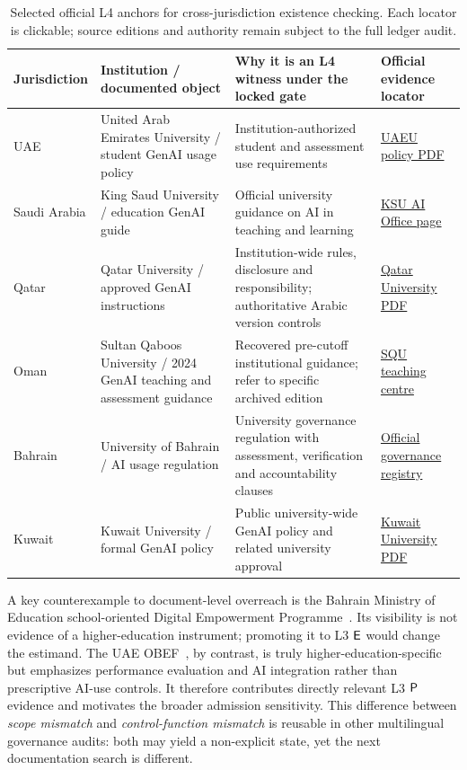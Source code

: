 \begin{table}[t]
\centering\caption{Selected official L4 anchors for cross-jurisdiction existence checking. Each locator is clickable; source editions and authority remain subject to the full ledger audit.}\label{tab:anchors}\footnotesize
\begin{tabularx}{\textwidth}{@{}p{}p{}p{}X@{}}
\toprule
Jurisdiction & Institution / documented object & Why it is an L4 witness under the locked gate & Official evidence locator\tabularnewline\midrule
UAE & United Arab Emirates University / student GenAI usage policy & Institution-authorized student and assessment use requirements & \href{https://www.uaeu.ac.ae/en/about/pdfs/policies-2025/generative-ai-policy.pdf}{UAEU policy PDF}\tabularnewline
Saudi Arabia & King Saud University / education GenAI guide & Official university guidance on AI in teaching and learning & \href{https://aio.ksu.edu.sa/ar/node/2976}{KSU AI Office page}\tabularnewline
Qatar & Qatar University / approved GenAI instructions & Institution-wide rules, disclosure and responsibility; authoritative Arabic version controls & \href{https://www.qu.edu.qa/en-us/about/policy/Documents/Instructions\%20onThe\%20Use\%20of\%20Generative\%20Artificial\%20Intelligence\%20Tools\%20at\%20Qatar\%20University-Approved.pdf}{Qatar University PDF}\tabularnewline
Oman & Sultan Qaboos University / 2024 GenAI teaching and assessment guidance & Recovered pre-cutoff institutional guidance; refer to specific archived edition & \href{https://www.squ.edu.om/About/Support-Centers-/Centre-For-Excellence-In-Teaching-and-Learning}{SQU teaching centre}\tabularnewline
Bahrain & University of Bahrain / AI usage regulation & University governance regulation with assessment, verification and accountability clauses & \href{https://governance.uob.edu.bh/view/297/entry/156/?pagenum=3}{Official governance registry}\tabularnewline
Kuwait & Kuwait University / formal GenAI policy & Public university-wide GenAI policy and related university approval & \href{https://www.ku.edu.kw/sites/default/files/2024-12/AI\%20Policy\%202024\%20November\%20-\%20English.pdf}{Kuwait University PDF}\tabularnewline
\bottomrule
\end{tabularx}
\end{table}

A key counterexample to document-level overreach is the Bahrain Ministry of Education school-oriented Digital Empowerment Programme~\cite{bahrain}. Its visibility is not evidence of a higher-education instrument; promoting it to L3 $\textsf{E}$ would change the estimand. The UAE OBEF~\cite{obef}, by contrast, is truly higher-education-specific but emphasizes performance evaluation and AI integration rather than prescriptive AI-use controls. It therefore contributes directly relevant L3 $\textsf{P}$ evidence and motivates the broader admission sensitivity. This difference between \emph{scope mismatch} and \emph{control-function mismatch} is reusable in other multilingual governance audits: both may yield a non-explicit state, yet the next documentation search is different.

